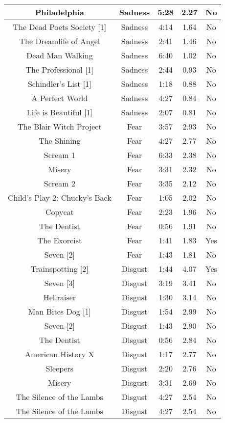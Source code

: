 \begin{table}[]
\begin{tabular}{|c|c|c|c|c|}
         Philadelphia & Sadness & 5:28 & 2.27   & No \\ \hline
         The Dead Poets Society [1] & Sadness & 4:14 & 1.64   & No \\ \hline
         The Dreamlife of Angel & Sadness & 2:41 & 1.46   & No \\ \hline
         Dead Man Walking & Sadness & 6:40 & 1.02   & No \\ \hline
         The Professional [1] & Sadness & 2:44 & 0.93   & No \\ \hline
         Schindler’s List [1] & Sadness & 1:18 & 0.88   & No \\ \hline
         A Perfect World & Sadness & 4:27 & 0.84   & No \\ \hline
         Life is Beautiful [1] & Sadness & 2:07 & 0.81   & No \\ \hline
          The Blair Witch Project & Fear & 3:57 & 2.93   & No \\ \hline
          The Shining & Fear & 4:27 & 2.77   & No \\ \hline
          Scream 1 & Fear & 6:33 & 2.38   & No \\ \hline
          Misery & Fear & 3:31 & 2.32   & No \\ \hline
          Scream 2 & Fear & 3:35 & 2.12   & No \\ \hline
          Child’s Play 2: Chucky’s Back & Fear & 1:05 & 2.02   & No \\ \hline
          Copycat & Fear & 2:23 & 1.96   & No \\ \hline
          The Dentist & Fear & 0:56 & 1.91   & No \\ \hline
          The Exorcist & Fear & 1:41 & 1.83   & Yes \\ \hline
          Seven [2] & Fear & 1:43 & 1.81   & No \\ \hline
          Trainspotting [2] & Disgust & 1:44 & 4.07   & Yes \\ \hline
          Seven [3] & Disgust & 3:19 & 3.41   & No \\ \hline
          Hellraiser & Disgust & 1:30 & 3.14   & No \\ \hline
          Man Bites Dog [1] & Disgust & 1:54 & 2.99   & No \\ \hline
          Seven [2] & Disgust & 1:43 & 2.90   & No \\ \hline
          The Dentist & Disgust & 0:56 & 2.84   & No \\ \hline
          American History X & Disgust & 1:17 & 2.77   & No \\ \hline
          Sleepers & Disgust & 2:20 & 2.76   & No \\ \hline
          Misery & Disgust & 3:31 & 2.69   & No \\ \hline
          The Silence of the Lambs & Disgust & 4:27 & 2.54   & No \\ \hline
          The Silence of the Lambs & Disgust & 4:27 & 2.54   & No \\ \hline
          

\end{tabular}
\end{table}
